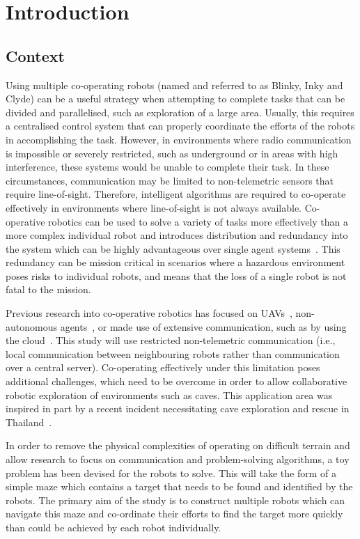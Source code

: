 
\chapter{Introduction}\label{introduction}
\section{Context}\label{introduction/context}
Using multiple co-operating robots (named and referred to as Blinky, Inky and Clyde) can be a useful strategy when attempting
to complete tasks that can be divided and parallelised, such as exploration of a large
area. Usually, this requires a centralised control system that can properly coordinate
the efforts of the robots in accomplishing the task. However, in environments
where radio communication is impossible or severely restricted, such as underground
or in areas with high interference, these systems would be unable to complete
their task. In these circumstances, communication may be limited to
non-telemetric sensors that require line-of-sight. Therefore, intelligent
algorithms are required to co-operate effectively in environments where line-of-sight
is not always available.
Co-operative robotics can be used to solve a variety of tasks
more effectively than a more complex individual robot and introduces
distribution and redundancy into the system which can be
highly advantageous over single agent systems~\cite{dudek96}. This redundancy
can be mission critical in scenarios where a hazardous environment poses risks
to individual robots, and means that the loss of a single robot is not fatal to
the mission.

Previous research into co-operative robotics has focused on UAVs~\cite{khan18},
non-autonomous agents~\cite{jimenez18}, or made use of extensive communication,
such as by using the cloud~\cite{wensing2018cooperative}. This study will use
restricted non-telemetric communication (i.e., local communication between
neighbouring robots rather than communication over a central server). Co-operating
effectively under this limitation poses additional challenges, which need to be overcome
in order to allow collaborative robotic exploration of environments such as caves.
This application area was inspired in part by a recent incident necessitating cave
exploration and rescue in Thailand~\cite{bbcthailand}.

In order to remove the physical complexities of operating on difficult
terrain and allow research to focus on communication and problem-solving algorithms,
a toy problem has been devised for the robots to solve. This will take the form
of a simple maze which contains a target that needs to be found and identified
by the robots. The primary aim of the study is to construct multiple robots which can
navigate this maze and co-ordinate their efforts to find the target more quickly than
could be achieved by each robot individually.

